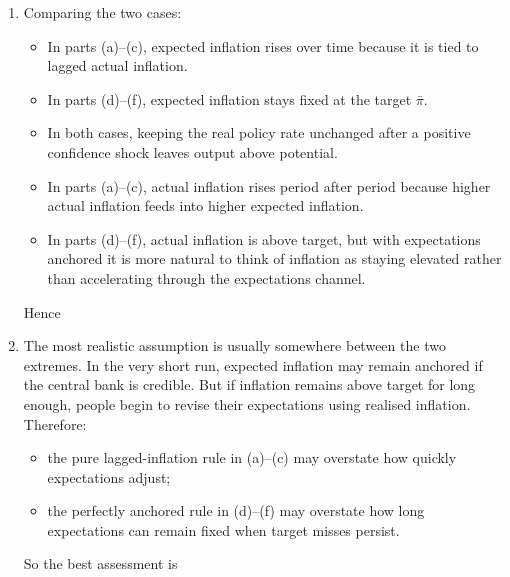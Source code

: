 \documentclass[12pt]{article}
\begin{document}
\begin{enumerate}[label=(\alph*)]
    \item
    Comparing the two cases:
    \begin{itemize}[leftmargin=*]
        \item In parts (a)--(c), expected inflation rises over time because it is tied to lagged actual inflation.
        \item In parts (d)--(f), expected inflation stays fixed at the target \(\bar{\pi}\).
        \item In both cases, keeping the real policy rate unchanged after a positive confidence shock leaves output above potential.
        \item In parts (a)--(c), actual inflation rises period after period because higher actual inflation feeds into higher expected inflation.
        \item In parts (d)--(f), actual inflation is above target, but with expectations anchored it is more natural to think of inflation as staying elevated rather than accelerating through the expectations channel.
    \end{itemize}
    Hence
    \begin{center}
    \end{center}

    \item
    The most realistic assumption is usually somewhere between the two extremes. In the very short run, expected inflation may remain anchored if the central bank is credible. But if inflation remains above target for long enough, people begin to revise their expectations using realised inflation. Therefore:
    \begin{itemize}[leftmargin=*]
        \item the pure lagged-inflation rule in (a)--(c) may overstate how quickly expectations adjust;
        \item the perfectly anchored rule in (d)--(f) may overstate how long expectations can remain fixed when target misses persist.
    \end{itemize}
    So the best assessment is
    \begin{center}
    \end{center}
\end{enumerate}
\end{document}
